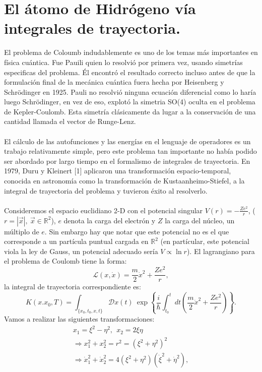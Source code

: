 \section{El átomo de Hidrógeno vía integrales de trayectoria.}
El problema de Coloumb indudablemente es uno de los temas más importantes en física cuántica. Fue Pauili quien lo resolvió por primera vez, usando simetrías especificas del problema. Él encontró el resultado correcto incluso antes de que la formulación final de la mecánica cuántica fuera hecha por Heisenberg y Schrödinger en 1925. Pauli no resolvió ninguna ecuación diferencial como lo haría luego Schrödinger, en vez de eso, explotó la simetria SO(4) oculta en el problema de Kepler-Coulomb. Esta simetría clásicamente da lugar a la conservación de una cantidad llamada el vector de Runge-Lenz.
\\
\\
El cálculo de las autofunciones y las energías en el lenguaje de operadores es un trabajo relativamente simple, pero este problema tan importante no había podido ser abordado por largo tiempo en el formalismo de integrales de trayectoria. En 1979, Duru y Kleinert [1] aplicaron una transformación espacio-temporal, conocida en astronomía como la transformación de Kustaanheimo-Stiefel, a la integral de trayectoria del problema y tuvieron éxito al resolverlo. 
\\
\\
Consideremos el espacio euclidiano 2-D con el potencial singular $V(r)=-\frac{Ze^2}{r}$, ($r=|\vec{x}|,\ \vec{x}\in\mathbb{R}^2 $), $e$ denota la carga del electrón y $Z$ la carga del núcleo, un múltiplo de $e$.
 Sin embargo hay que notar que este potencial no es el que corresponde a un partícula puntual cargada en $\mathbb{R}^2$ (en partícular, este potencial viola la ley de Gauss, un potencial adecuado sería $V\propto \ln r$). El lagrangiano para el problema de Coulomb tiene la forma:
\begin{equation}
\mathcal{L}(x,\dot{x})=\frac{m}{2}\dot{x}^{2}+\frac{Ze^{2}}{r},
\end{equation}
la integral de trayectoria correspondiente es:
\begin{equation}
K(x.x_{0},T)=\int_{\{x_{0},t_{0},x,t\}}\mathcal{D}x(t)\ \exp\left\{ \frac{i}{\hbar}\int_{t_{0}}^{t}dt\left(\frac{m}{2}\dot{x}^{2}+\frac{Ze^{2}}{r}\right)\right\}. 
\end{equation}
Vamos a realizar las siguientes transformaciones:
\begin{eqnarray}
&x_{1}=\xi^{2}-\eta^{2},\ \ x_{2}=2\xi\eta &\\
&\Rightarrow x_{1}^{2}+x_{2}^{2}=r^{2}=(\xi^{2}+\eta^{2})^{2}&\\
&\Rightarrow \dot{x}_{1}^{2}+\dot{x}_{2}^{2}=4(\xi^{2}+\eta^{2})(\dot{\xi}^{2}+\dot{\eta}^{2}),&
\end{eqnarray}

